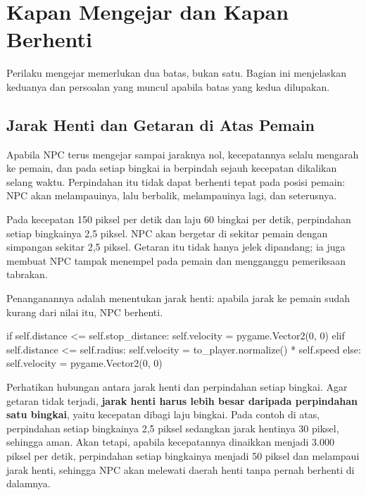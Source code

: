 \section{Kapan Mengejar dan Kapan Berhenti}
\label{sec:berhenti}

Perilaku mengejar memerlukan dua batas, bukan satu. Bagian ini menjelaskan
keduanya dan persoalan yang muncul apabila batas yang kedua dilupakan.

\subsection{Jarak Henti dan Getaran di Atas Pemain}

Apabila NPC terus mengejar sampai jaraknya nol, kecepatannya selalu mengarah
ke pemain, dan pada setiap bingkai ia berpindah sejauh kecepatan dikalikan
selang waktu. Perpindahan itu tidak dapat berhenti tepat pada posisi pemain:
NPC akan melampauinya, lalu berbalik, melampauinya lagi, dan seterusnya.

Pada kecepatan 150 piksel per detik dan laju 60 bingkai per detik, perpindahan
setiap bingkainya 2,5 piksel. NPC akan bergetar di sekitar pemain dengan
simpangan sekitar 2,5 piksel. Getaran itu tidak hanya jelek dipandang; ia juga
membuat NPC tampak menempel pada pemain dan mengganggu pemeriksaan tabrakan.

Penanganannya adalah menentukan jarak henti: apabila jarak ke pemain sudah
kurang dari nilai itu, NPC berhenti.

\begin{kodekeluaran}
if self.distance <= self.stop_distance:
    self.velocity = pygame.Vector2(0, 0)
elif self.distance <= self.radius:
    self.velocity = to_player.normalize() * self.speed
else:
    self.velocity = pygame.Vector2(0, 0)
\end{kodekeluaran}

\begin{tipsbox}
Perhatikan hubungan antara jarak henti dan perpindahan setiap bingkai. Agar
getaran tidak terjadi, \textbf{jarak henti harus lebih besar daripada
perpindahan satu bingkai}, yaitu kecepatan dibagi laju bingkai. Pada contoh di
atas, perpindahan setiap bingkainya 2,5 piksel sedangkan jarak hentinya 30
piksel, sehingga aman. Akan tetapi, apabila kecepatannya dinaikkan menjadi
3.000 piksel per detik, perpindahan setiap bingkainya menjadi 50 piksel dan
melampaui jarak henti, sehingga NPC akan melewati daerah henti tanpa pernah
berhenti di dalamnya.
\end{tipsbox}

